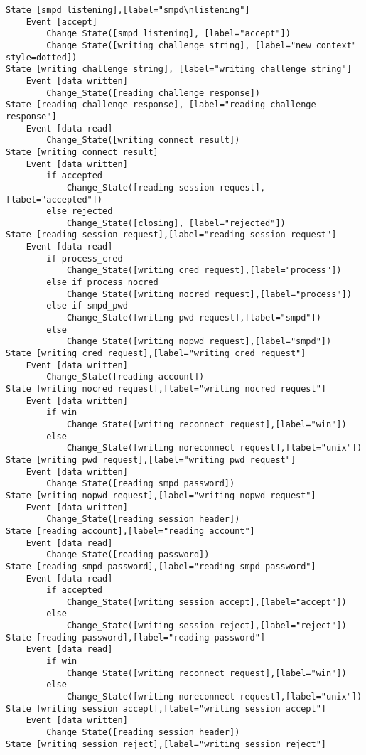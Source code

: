 \begin{comment}
This is the state machine for the smpd listener process.
Graph [smpd listener],
      [size="7.5, 10"]
\end{comment}
\begin{verbatim}
State [smpd listening],[label="smpd\nlistening"]
	Event [accept]
		Change_State([smpd listening], [label="accept"])
		Change_State([writing challenge string], [label="new context" style=dotted])
State [writing challenge string], [label="writing challenge string"]
	Event [data written]
		Change_State([reading challenge response])
State [reading challenge response], [label="reading challenge response"]
	Event [data read]
		Change_State([writing connect result])
State [writing connect result]
	Event [data written]
		if accepted
			Change_State([reading session request], [label="accepted"])
		else rejected
			Change_State([closing], [label="rejected"])
State [reading session request],[label="reading session request"]
	Event [data read]
		if process_cred
			Change_State([writing cred request],[label="process"])
		else if process_nocred
			Change_State([writing nocred request],[label="process"])
		else if smpd_pwd
			Change_State([writing pwd request],[label="smpd"])
		else
			Change_State([writing nopwd request],[label="smpd"])
State [writing cred request],[label="writing cred request"]
	Event [data written]
		Change_State([reading account])
State [writing nocred request],[label="writing nocred request"]
	Event [data written]
		if win
			Change_State([writing reconnect request],[label="win"])
		else
			Change_State([writing noreconnect request],[label="unix"])
State [writing pwd request],[label="writing pwd request"]
	Event [data written]
		Change_State([reading smpd password])
State [writing nopwd request],[label="writing nopwd request"]
	Event [data written]
		Change_State([reading session header])
State [reading account],[label="reading account"]
	Event [data read]
		Change_State([reading password])
State [reading smpd password],[label="reading smpd password"]
	Event [data read]
		if accepted
			Change_State([writing session accept],[label="accept"])
		else
			Change_State([writing session reject],[label="reject"])
State [reading password],[label="reading password"]
	Event [data read]
		if win
			Change_State([writing reconnect request],[label="win"])
		else
			Change_State([writing noreconnect request],[label="unix"])
State [writing session accept],[label="writing session accept"]
	Event [data written]
		Change_State([reading session header])
State [writing session reject],[label="writing session reject"]

\end{verbatim}
